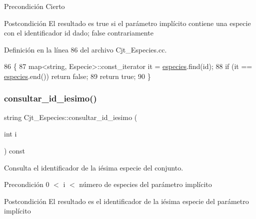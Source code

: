 \begin{DoxyPrecond}{Precondición}
Cierto 
\end{DoxyPrecond}
\begin{DoxyPostcond}{Postcondición}
El resultado es true si el parámetro implícito contiene una especie con el identificador id dado; false contrariamente 
\end{DoxyPostcond}


Definición en la línea 86 del archivo Cjt\+\_\+\+Especies.\+cc.


\begin{DoxyCode}
86                                                         \{
87   map<string, Especie>::const\_iterator it = \hyperlink{class_cjt___especies_a8f319699bd2e8a42b85ec47b67c17563}{especies}.find(\textcolor{keywordtype}{id});
88   \textcolor{keywordflow}{if} (it == \hyperlink{class_cjt___especies_a8f319699bd2e8a42b85ec47b67c17563}{especies}.end()) \textcolor{keywordflow}{return} \textcolor{keyword}{false};
89   \textcolor{keywordflow}{return} \textcolor{keyword}{true};
90 \}
\end{DoxyCode}
\mbox{\label{class_cjt___especies_a0cc233873c53e5120cd362de7821eb16}} 
\subsubsection{\texorpdfstring{consultar\+\_\+id\+\_\+iesimo()}{consultar\_id\_iesimo()}}
{\footnotesize\ttfamily string Cjt\+\_\+\+Especies\+::consultar\+\_\+id\+\_\+iesimo (\begin{DoxyParamCaption}\item[{int}]{i }\end{DoxyParamCaption}) const}



Consulta el identificador de la iésima especie del conjunto. 

\begin{DoxyPrecond}{Precondición}
0 $<$ i $<$ número de especies del parámetro implícito 
\end{DoxyPrecond}
\begin{DoxyPostcond}{Postcondición}
El resultado es el identificador de la iésima especie del parámetro implícito 
\end{DoxyPostcond}


